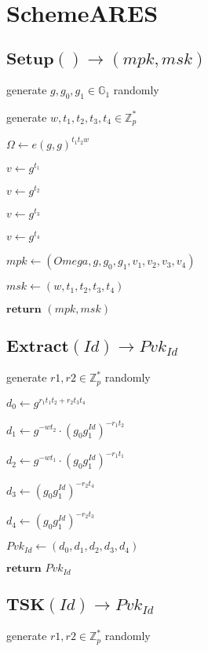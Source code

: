 \documentclass[a4paper]{article}
\begin{document}
\section{SchemeARES}

\subsection{$\textbf{Setup}() \rightarrow (\textit{mpk}, \textit{msk})$}

generate $g, g_0, g_1 \in \mathbb{G}_1$ randomly

generate $w, t_1, t_2, t_3, t_4 \in \mathbb{Z}_p^*$

$\Omega \gets e(g, g)^{t_1 t_2 w}$

$v \gets g^{t_1}$

$v \gets g^{t_2}$

$v \gets g^{t_3}$

$v \gets g^{t_4}$

$\textit{mpk} \gets (Omega, g, g_0, g_1, v_1, v_2, v_3, v_4)$

$\textit{msk} \gets (w, t_1, t_2, t_3, t_4)$

$\textbf{return }(\textit{mpk}, \textit{msk})$

\subsection{$\textbf{Extract}(\textit{Id}) \rightarrow \textit{Pvk}_\textit{Id}$}

generate $r1, r2 \in \mathbb{Z}_p^*$ randomly

$d_0 \gets g^{r_1 t_1 t_2 + r_2 t_3 t_4}$

$d_1 \gets g^{- w t_2} \cdot (g_0 g_1^\textit{Id})^{-  r_1 t_2}$

$d_2 \gets g^{- w t_1} \cdot (g_0 g_1^\textit{Id})^{-  r_1 t_1}$

$d_3 \gets (g_0 g_1^\textit{Id})^{-  r_2 t_4}$

$d_4 \gets (g_0 g_1^\textit{Id})^{-  r_2 t_3}$

$\textit{Pvk}_\textit{Id} \gets (d_0, d_1, d_2, d_3, d_4)$

$\textbf{return }\textit{Pvk}_\textit{Id}$

\subsection{$\textbf{TSK}(\textit{Id}) \rightarrow \textit{Pvk}_\textit{Id}$}

generate $r1, r2 \in \mathbb{Z}_p^*$ randomly
\end{document}
